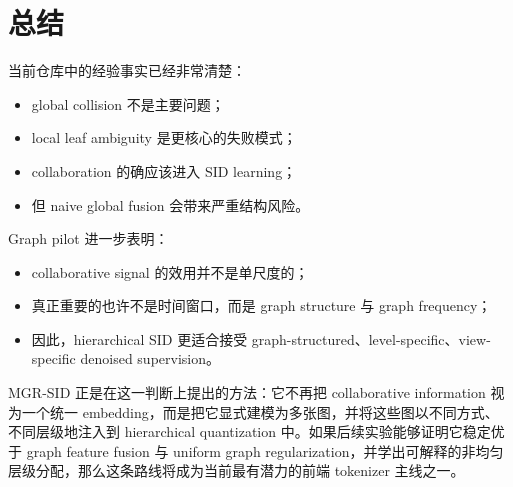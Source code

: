 \documentclass[11pt]{article}
\begin{document}
\section{总结}

当前仓库中的经验事实已经非常清楚：
\begin{itemize}
  \item global collision 不是主要问题；
  \item local leaf ambiguity 是更核心的失败模式；
  \item collaboration 的确应该进入 SID learning；
  \item 但 naive global fusion 会带来严重结构风险。
\end{itemize}

Graph pilot 进一步表明：
\begin{itemize}
  \item collaborative signal 的效用并不是单尺度的；
  \item 真正重要的也许不是时间窗口，而是 graph structure 与 graph frequency；
  \item 因此，hierarchical SID 更适合接受 graph-structured、level-specific、view-specific denoised supervision。
\end{itemize}

MGR-SID 正是在这一判断上提出的方法：它不再把 collaborative information 视为一个统一 embedding，而是把它显式建模为多张图，并将这些图以不同方式、不同层级地注入到 hierarchical quantization 中。如果后续实验能够证明它稳定优于 graph feature fusion 与 uniform graph regularization，并学出可解释的非均匀层级分配，那么这条路线将成为当前最有潜力的前端 tokenizer 主线之一。
\end{document}
